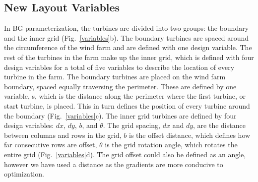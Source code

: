 \documentclass[wes, manuscript]{copernicus}
\begin{document}
\subsection{New Layout Variables}
In BG parameterization, the turbines are divided into two groups: the boundary and the inner grid (Fig.~\ref{variables}b). The boundary turbines are spaced around the circumference of the wind farm and are defined with one design variable. The rest of the turbines in the farm make up the inner grid, which is defined with four design variables for a total of five variables to describe the location of every turbine in the farm.
The boundary turbines are placed on the wind farm boundary, spaced equally traversing the perimeter. These are defined by one variable, s, which is the distance along the perimeter where the first turbine, or start turbine, is placed. This in turn defines the position of every turbine around the boundary (Fig.~\ref{variables}c). The inner grid turbines are defined by four design variables: $dx$, $dy$, $b$, and $\theta$. 
%
The grid spacing, $dx$ and $dy$, are the distance between columns and rows in the grid, $b$ is the offset distance, which defines how far consecutive rows are offset, $\theta$ is the grid rotation angle, which rotates the entire grid (Fig.~\ref{variables}d). The grid offset could also be defined as an angle, however we have used a distance as the gradients are more conducive to optimization.
\end{document}
